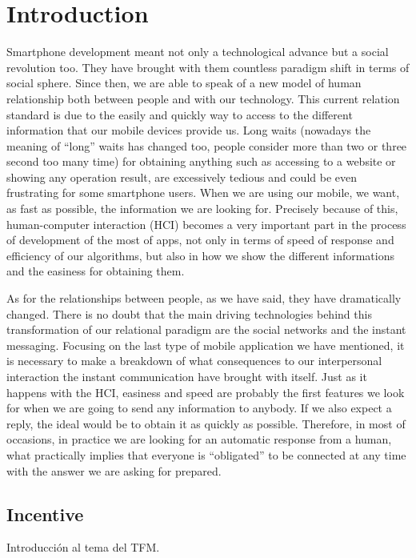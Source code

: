 \chapter{Introduction}
\label{cap:introduccion}


Smartphone development meant not only a technological advance but a social revolution too. They have brought with them countless paradigm shift in terms of social sphere. Since then, we are able to speak of a new model of human relationship both between people and with our technology. This current relation standard is due to the easily and quickly way to access to the different information that our mobile devices provide us. Long waits (nowadays the meaning of ``long'' waits has changed too, people consider more than two or three second too many time) for obtaining anything such as accessing to a website or showing any operation result, are excessively tedious and could be even frustrating for some smartphone users. When we are using our mobile, we want, as fast as possible, the information we are looking for. Precisely because of this, human-computer interaction (HCI) becomes a very important part in the process of development of the most of apps, not only in terms of speed of response and efficiency of our algorithms, but also in how we show the different informations and the easiness for obtaining them.

As for the relationships between people, as we have said, they have dramatically changed. There is no doubt that the main driving technologies behind this transformation of our relational paradigm are the social networks and the instant messaging. Focusing on the last type of mobile application we have mentioned, it is necessary to make a breakdown of what consequences to our interpersonal interaction the instant communication have brought with itself. Just as it happens with the HCI, easiness and speed are probably the first features we look for when we are going to send any information to anybody. If we also expect a reply, the ideal would be to obtain it as quickly as possible. Therefore, in most of occasions, in practice we are looking for an automatic response from a human, what practically implies that everyone is ``obligated'' to be connected at any time with the answer we are asking for prepared.


\section{Incentive}
Introducción al tema del TFM.


